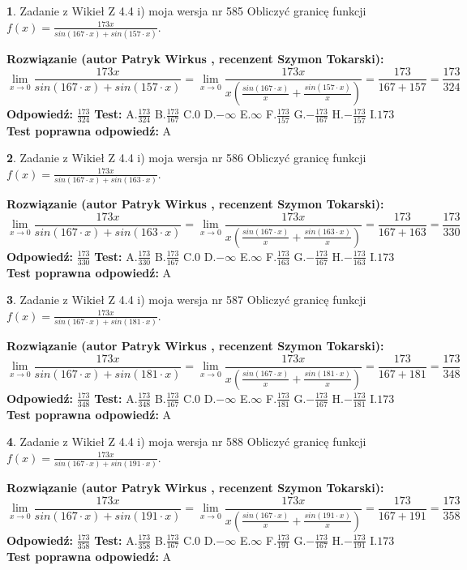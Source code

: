 \documentclass[12pt, a4paper]{article}
\theoremstyle{definition} %
\newtheorem{zad}{}
\newcommand{\zadStart}[1]{\begin{zad}#1\newline}
\newcommand{\zadStop}{\end{zad}}
\newcommand{\rozwStart}[2]{\noindent \textbf{Rozwiązanie (autor #1 , recenzent #2): }\newline}
\newcommand{\rozwStop}{\newline}
\newcommand{\odpStart}{\noindent \textbf{Odpowiedź:}\newline}
\newcommand{\odpStop}{\newline}
\newcommand{\testStart}{\noindent \textbf{Test:}\newline}
\newcommand{\testStop}{\newline}
\newcommand{\kluczStart}{\noindent \textbf{Test poprawna odpowiedź:}\newline}
\newcommand{\kluczStop}{\newline}
\begin{document}
\zadStart{Zadanie z Wikieł Z 4.4 i) moja wersja nr 585}
Obliczyć granicę funkcji $f(x)=\frac{173x}{sin(167\cdot x) +sin(157\cdot x)}$.
\zadStop
\rozwStart{Patryk Wirkus}{Szymon Tokarski}
$$\lim\limits_{x\to 0}\frac{173x}{sin(167\cdot x) +sin(157\cdot x)}=\lim\limits_{x\to 0}\frac{173x}{x(\frac{sin(167\cdot x)}{x}+\frac{sin(157\cdot x)}{x})}=\frac{173}{167+157} = \frac{173}{324}$$
\rozwStop
\odpStart
$\frac{173}{324}$
\odpStop
\testStart
A.$\frac{173}{324}$
B.$\frac{173}{167}$
C.$0$
D.$-\infty$
E.$\infty$
F.$\frac{173}{157}$
G.$-\frac{173}{167}$
H.$-\frac{173}{157}$
I.$173$
\testStop
\kluczStart
A
\kluczStop



\zadStart{Zadanie z Wikieł Z 4.4 i) moja wersja nr 586}
Obliczyć granicę funkcji $f(x)=\frac{173x}{sin(167\cdot x) +sin(163\cdot x)}$.
\zadStop
\rozwStart{Patryk Wirkus}{Szymon Tokarski}
$$\lim\limits_{x\to 0}\frac{173x}{sin(167\cdot x) +sin(163\cdot x)}=\lim\limits_{x\to 0}\frac{173x}{x(\frac{sin(167\cdot x)}{x}+\frac{sin(163\cdot x)}{x})}=\frac{173}{167+163} = \frac{173}{330}$$
\rozwStop
\odpStart
$\frac{173}{330}$
\odpStop
\testStart
A.$\frac{173}{330}$
B.$\frac{173}{167}$
C.$0$
D.$-\infty$
E.$\infty$
F.$\frac{173}{163}$
G.$-\frac{173}{167}$
H.$-\frac{173}{163}$
I.$173$
\testStop
\kluczStart
A
\kluczStop



\zadStart{Zadanie z Wikieł Z 4.4 i) moja wersja nr 587}
Obliczyć granicę funkcji $f(x)=\frac{173x}{sin(167\cdot x) +sin(181\cdot x)}$.
\zadStop
\rozwStart{Patryk Wirkus}{Szymon Tokarski}
$$\lim\limits_{x\to 0}\frac{173x}{sin(167\cdot x) +sin(181\cdot x)}=\lim\limits_{x\to 0}\frac{173x}{x(\frac{sin(167\cdot x)}{x}+\frac{sin(181\cdot x)}{x})}=\frac{173}{167+181} = \frac{173}{348}$$
\rozwStop
\odpStart
$\frac{173}{348}$
\odpStop
\testStart
A.$\frac{173}{348}$
B.$\frac{173}{167}$
C.$0$
D.$-\infty$
E.$\infty$
F.$\frac{173}{181}$
G.$-\frac{173}{167}$
H.$-\frac{173}{181}$
I.$173$
\testStop
\kluczStart
A
\kluczStop



\zadStart{Zadanie z Wikieł Z 4.4 i) moja wersja nr 588}
Obliczyć granicę funkcji $f(x)=\frac{173x}{sin(167\cdot x) +sin(191\cdot x)}$.
\zadStop
\rozwStart{Patryk Wirkus}{Szymon Tokarski}
$$\lim\limits_{x\to 0}\frac{173x}{sin(167\cdot x) +sin(191\cdot x)}=\lim\limits_{x\to 0}\frac{173x}{x(\frac{sin(167\cdot x)}{x}+\frac{sin(191\cdot x)}{x})}=\frac{173}{167+191} = \frac{173}{358}$$
\rozwStop
\odpStart
$\frac{173}{358}$
\odpStop
\testStart
A.$\frac{173}{358}$
B.$\frac{173}{167}$
C.$0$
D.$-\infty$
E.$\infty$
F.$\frac{173}{191}$
G.$-\frac{173}{167}$
H.$-\frac{173}{191}$
I.$173$
\testStop
\kluczStart
A
\kluczStop
\end{document}
